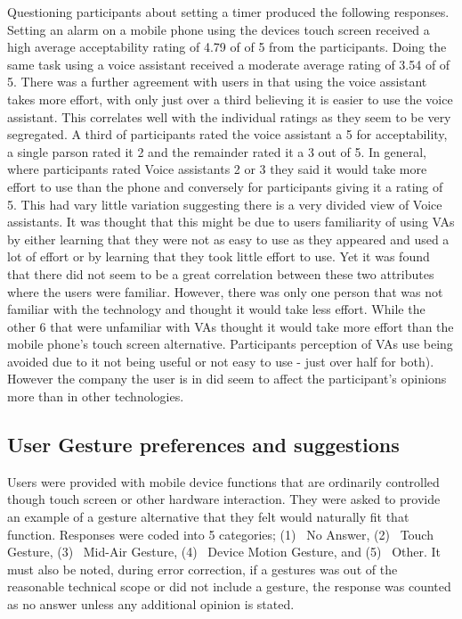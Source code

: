 \documentclass{l4proj}
\begin{document}
Questioning participants about setting a timer produced the following responses. Setting an alarm on a mobile phone using the devices touch screen received a high average acceptability rating of 4.79 of of 5 from the participants. Doing the same task using a voice assistant received a moderate average rating of 3.54 of of 5. There was a further agreement with users in that using the voice assistant takes more effort, with only just over a third believing it is easier to use the voice assistant. This correlates well with the individual ratings as they seem to be very segregated. A third of participants rated the voice assistant a 5 for acceptability, a single parson rated it 2 and the remainder rated it a 3 out of 5. In general, where participants rated Voice assistants 2 or 3 they said it would take more effort to use than the phone and conversely for participants giving it a rating of 5. This had vary little variation suggesting there is a very divided view of Voice assistants. It was thought that this might be due to users familiarity of using VAs by either learning that they were not as easy to use as they appeared and used a lot of effort or by learning that they took little effort to use. Yet it was found that there did not seem to be a great correlation between these two attributes where the users were familiar. However, there was only one person that was not familiar with the technology and thought it would take less effort. While the other 6 that were unfamiliar with VAs thought it would take more effort than the mobile phone's touch screen alternative. Participants perception of VAs use being avoided due to it not being useful or not easy to use - just over half for both). However the company the user is in did seem to affect the participant's opinions more than in other technologies.

\subsection{User Gesture preferences and suggestions}
Users were provided with mobile device functions that are ordinarily controlled though touch screen or other hardware interaction. They were asked to provide an example of a gesture alternative that they felt would naturally fit that function. Responses were coded into 5 categories; (1)~ No Answer, (2)~ Touch Gesture, (3)~ Mid-Air Gesture, (4)~ Device Motion Gesture, and (5)~ Other. It must also be noted, during error correction, if a gestures was out of the reasonable technical scope or did not include a gesture, the response was counted as no answer unless any additional opinion is stated.
\end{document}
